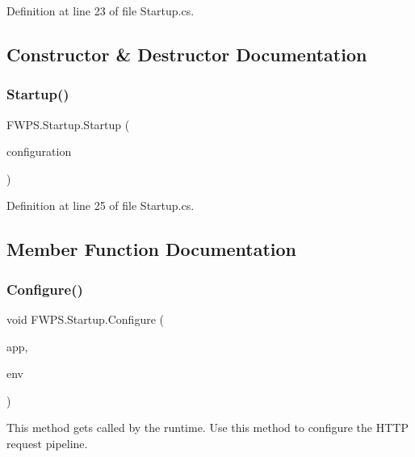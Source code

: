 Definition at line 23 of file Startup.\+cs.



\subsection{Constructor \& Destructor Documentation}
\mbox{\label{class_f_w_p_s_1_1_startup_afd871a5956ab61fc598099dc6f3c6a39}} 
\subsubsection{\texorpdfstring{Startup()}{Startup()}}
{\footnotesize\ttfamily F\+W\+P\+S.\+Startup.\+Startup (\begin{DoxyParamCaption}\item[{I\+Configuration}]{configuration }\end{DoxyParamCaption})}



Definition at line 25 of file Startup.\+cs.



\subsection{Member Function Documentation}
\mbox{\label{class_f_w_p_s_1_1_startup_aa583f17e9347665fd84de6d6affa9fc1}} 
\subsubsection{\texorpdfstring{Configure()}{Configure()}}
{\footnotesize\ttfamily void F\+W\+P\+S.\+Startup.\+Configure (\begin{DoxyParamCaption}\item[{I\+Application\+Builder}]{app,  }\item[{I\+Hosting\+Environment}]{env }\end{DoxyParamCaption})}



This method gets called by the runtime. Use this method to configure the H\+T\+TP request pipeline. 



